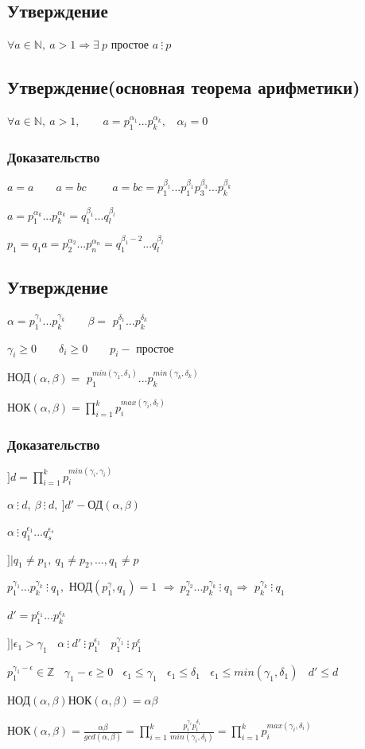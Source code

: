 \documentclass[12pt]{article}
\begin{document}
\subsection{Утверждение}
$\forall a \in \mathbb{N},\ a > 1 \Rightarrow \exists \ p$ простое $a\ \vdots \ p$
\subsection{Утверждение(основная теорема арифметики)}
$\forall a \in \mathbb{N}, \ a>1, \qquad a = p_1^{\alpha_1} ... p_k^{\alpha_k}, \ \ \ \ \alpha_i = 0$
\subsubsection{Доказательство}
$a = a \qquad a=bc \qquad$ $a=bc=p_1^{\beta_1}...p_1^{\beta_1}p_3^{\beta_3}...p_k^{\beta_k}$ \par $a=p_1^{\alpha_k}...p_k^{\alpha_k} = q_1^{\beta_1}...q_l^{\beta_l}$ \par
$p_1 = q_1a=p_2^{\alpha_2}...p_n^{\alpha_n}=q_1^{\beta_1-2}...q_l^{\beta_l}$
\subsection{Утверждение}
$\alpha=p_1^{\gamma_1}...p_k^{\gamma_k} \qquad \beta=$ $p_1^{\delta_1}...p_k^{\delta_k}$\par
$\gamma_i \geq 0 \qquad \delta_i \geq 0 \qquad p_i -$ простое \par
НОД$(\alpha, \beta) =$
$ p_1^{min(\gamma_1, \delta_1)}...p_k^{min(\gamma_k, \delta_k)}$ \par
НОК$(\alpha, \beta)=\prod_{i=1}^kp_i^{max(\gamma_i, \delta_l)}$
\subsubsection{Доказательство}
$] d = \prod_{i=1}^k p_i^{min(\gamma_i, \gamma_i)}$ \par
$\alpha \ \vdots \ d, \  \beta \ \vdots \ d, \ ]d'-$ОД$(\alpha, \beta)$ \par
$\alpha \ \vdots \ q_1^{\epsilon_1}...q_s^{\epsilon_s}$ \par
$]| q_1 \not= p_1, \ q_1\not= p_2,...,q_1\not=p$ \par
$p_1^{\gamma_1}...p_k^{\gamma_k} \ \vdots \ q_1,$ НОД$(p_1^\gamma, q_1) = 1$
$\Rightarrow \ p_2^{\gamma_2}...p_k^{\gamma_k} \ \vdots \ q_1 \Rightarrow$
$p_k^{\gamma_k}\ \vdots \ q_1$ \par
$d' = p_1^{\epsilon_1}...p_k^{\epsilon_k}$ \par
$]| \epsilon_1>\gamma_1 \ \ \ \ \alpha \ \vdots \ d' \ \vdots \ p_1^{\epsilon_1} \ \ \ \ p_1^{\gamma_1} \ \vdots \ p_1^\epsilon$ \par
$p_1^{\gamma_1 - \epsilon} \in \mathbb{Z} \ \ \ \ \gamma_1-\epsilon \geq 0 \ \ \ \ \epsilon_1 \leq \gamma_1 \ \ \ \ \epsilon_1 \leq \delta_1 \ \ \ \ \epsilon_1 \leq min(\gamma_1, \delta_1) \ \ \ \ d' \leq d$ \par
НОД$(\alpha, \beta)$НОК$(\alpha, \beta) = \alpha\beta$ \par
НОК$(\alpha, \beta) = \frac{\alpha\beta}{gcd(\alpha, \beta)}=\prod_{i=1}^k \frac{p_i^{\gamma_i}p_i^{\delta_i}}{min(\gamma_i, \delta_i)}=\prod_{i = 1}^kp_i^{max(\gamma_i, \delta_i)}$
\end{document}
